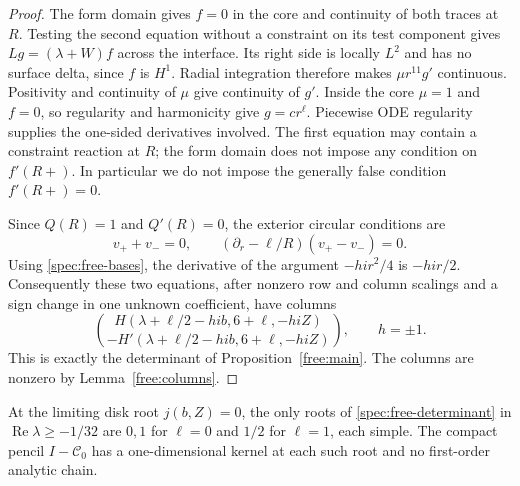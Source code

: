 \begin{proof}
The form domain gives $f=0$ in the core and continuity of both traces
at $R$. Testing the second equation without a constraint on its test
component gives
$Lg=(\lambda+W)f$ across the interface. Its right side is locally
$L^2$ and has no surface delta, since $f$ is $H^1$. Radial integration
therefore makes $\mu r^{11}g'$ continuous. Positivity and continuity
of $\mu$ give continuity of $g'$. Inside the core $\mu=1$ and $f=0$,
so regularity and harmonicity give $g=c r^\ell$.
Piecewise ODE regularity supplies the one-sided derivatives involved.
The first equation may contain a constraint reaction at $R$; the form
domain does not impose any condition on $f'(R+)$. In particular we
do not impose the generally false condition $f'(R+)=0$.

Since $Q(R)=1$ and $Q'(R)=0$, the exterior circular conditions are
\[
 v_++v_-=0,\qquad
 (\partial_r-\ell/R)(v_+-v_-)=0.
\]
Using \eqref{spec:free-bases}, the derivative of the argument
$-hi r^2/4$ is $-hi r/2$. Consequently these two equations, after
nonzero row and column scalings and a sign change in one unknown
coefficient, have columns
\begin{equation}\label{spec:free-determinant}
 \binom{H(\lambda+\ell/2-hib,6+\ell,-hiZ)}
       {-H'(\lambda+\ell/2-hib,6+\ell,-hiZ)},\qquad h=\pm1.
\end{equation}
This is exactly the determinant of Proposition~\ref{free:main}.
The columns are nonzero by Lemma~\ref{free:columns}.
\end{proof}

\begin{lemma}\label{spec:simplicity}
At the limiting disk root $j(b,Z)=0$, the only roots of
\eqref{spec:free-determinant} in $\operatorname{Re}\lambda\ge-1/32$
are $0,1$ for $\ell=0$ and $1/2$ for $\ell=1$, each simple.
The compact pencil $I-\mathcal C_0$ has a one-dimensional kernel at
each such root and no first-order analytic chain.
\end{lemma}

